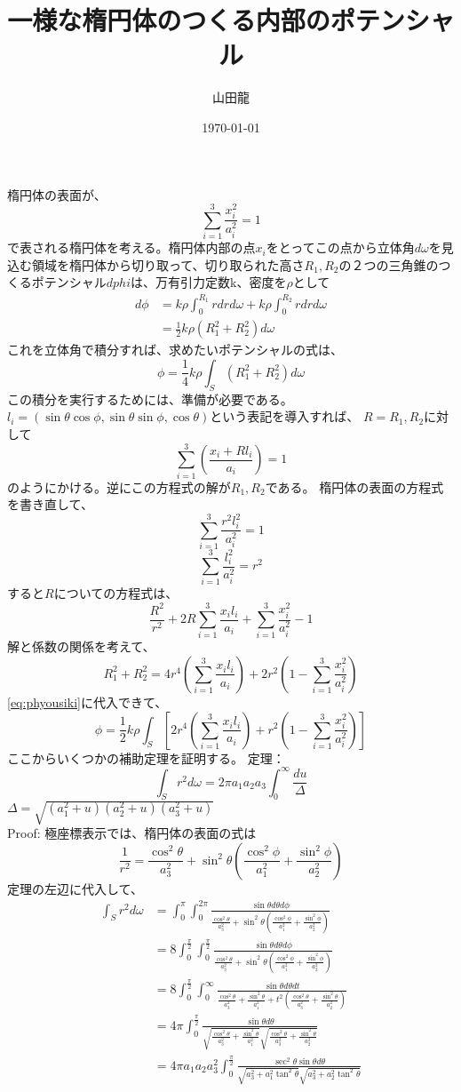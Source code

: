\documentclass{jsarticle}
\date{\today}
\author{山田龍}
\title{一様な楕円体のつくる内部のポテンシャル}
\newcommand{\half}{\frac{1}{2}}
\newcommand{\beq}{\begin{equation}}
\newcommand{\eeq}{\end{equation}}
\newcommand{\xid}{x_i^2}
\newcommand{\lid}{l_i^2}
\newcommand{\aid}{a_i^2}
\newcommand{\sumit}{\sum_{i=1}^3}
\newcommand{\cosdt}{\cos^2\theta}
\newcommand{\sindt}{\sin^2\theta}
\newcommand{\tandt}{\tan^2\theta}
\newcommand{\cosdp}{\cos^2\phi}
\newcommand{\sindp}{\sin^2\phi}
\begin{document}
\maketitle
\section{}
楕円体の表面が、
\beq
\sum_{i=1}^3 \frac{\xid}{\aid} = 1
\eeq
で表される楕円体を考える。楕円体内部の点$x_i$をとってこの点から立体角$d\omega$を見込む領域を楕円体から切り取って、切り取られた高さ$R_1, R_2$の２つの三角錐のつくるポテンシャル$dphi$は、万有引力定数k、密度を$\rho$として
\begin{align}
d\phi &= k \rho \int_{0}^{R_1} r dr d\omega +
k \rho \int_{0}^{R_2} r dr d\omega\\
      &=  \half k \rho (R_1^2 + R_2^2) d\omega
\end{align}
これを立体角で積分すれば、求めたいポテンシャルの式は、
\beq
\phi = \frac{1}{4} k \rho \int_S (R_1^2 + R_2^2) d\omega\label{eq:phyousiki}
\eeq
この積分を実行するためには、準備が必要である。
$l_i = (\sin\theta \cos\phi, \sin\theta \sin\phi ,\cos\theta)$という表記を導入すれば、
$R = R_1, R_2$に対して
\beq
\sum_{i=1}^3 \left (\frac{x_i + R l_i}{a_i} \right) = 1\label{eq:daenl}
\eeq
のようにかける。逆にこの方程式の解が$R_1,R_2$である。
楕円体の表面の方程式を書き直して、
\beq
\sum_{i=1}^3 \frac{r^2 \lid}{\aid} = 1
\eeq
\beq
\sum_{i=1}^3 \frac{\lid}{\aid} = r^2
\eeq
すると$R$についての方程式は、
\beq
\frac{R^2}{r^2} + 2R\sumit \frac{x_i l_i}{a_i} + \sumit \frac{\xid}{\aid} - 1
\eeq
解と係数の関係を考えて、
\beq
R_1^2 + R_2^2 = 4r^4 \left(\sumit \frac{x_i l_i}{a_i} \right) + 2r^2 \left(1 -  \sumit \frac{\xid}{\aid}
\right)
\eeq
\eqref{eq:phyousiki}に代入できて、
\beq
\phi = \frac{1}{2} k \rho \int_S \left[2r^4 \left(\sumit \frac{x_i l_i}{a_i} \right) + r^2 \left(1 -  \sumit \frac{\xid}{\aid}\right)\right]
\label{eq:steptwo}
\eeq
ここからいくつかの補助定理を証明する。
定理：
\beq
\int _S r^2 d\omega = 2 \pi a_1 a_2 a_3 \int_0^{\infty} \frac{du}{\Delta}
\eeq
$\Delta = \sqrt{(a_1^2 + u)(a_2^2 + u)(a_3^2 + u)}$\\
Proof:
極座標表示では、楕円体の表面の式は
\beq
\frac{1}{r^2} = \frac{\cosdt}{a_3^2} + \sindt(\frac{\cosdp}{a_1^2} + \frac{\sindp}{a_2^2})
\eeq
定理の左辺に代入して、
\begin{align}
    \int_S r^2 d\omega &= \int_0^\pi \int_0^{2\pi}
    \frac{\sin\theta d\theta d\phi}{\frac{\cosdt}{a_3^2} + \sindt(\frac{\cosdp}{a_1^2} + \frac{\sindp}{a_2^2})
}\\
&= 8 \int_0^{\frac{\pi}{2}} \int_0^{\frac{\pi}{2}}
    \frac{\sin\theta d\theta d\phi}{\frac{\cosdt}{a_3^2} + \sindt(\frac{\cosdp}{a_1^2} + \frac{\sindp}{a_2^2})
}\\
&= 8 \int_0^{\frac{\pi}{2}} \int_0^{\infty}
\frac{\sin\theta d\theta dt}{\frac{\cosdt}{a_3^2} +\frac{\sindt}{a_1^2} + t^2(\frac{\cosdt}{a_3^2} + \frac{\sindt}{a_2^2})
}\\
&= 4\pi \int_0^{\frac{\pi}{2}} \frac{\sin\theta d\theta}{\sqrt{\frac{\cosdt}{a_3^2} +\frac{\sindt}{a_1^2}} \sqrt{\frac{\cosdt}{a_3^2} + \frac{\sindt}{a_2^2}
}}\\
&= 4\pi a_1 a_2 a_3^2
\int_0^{\frac{\pi}{2}} \frac{\sec^2\theta \sin\theta d\theta}
{\sqrt{a_3^2 +a_1^2\tandt} \sqrt{a_3^2 + a_2^2 \tandt}}
\end{align}
\end{document}
